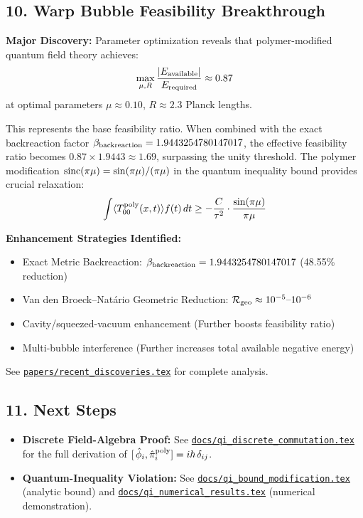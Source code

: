 \documentclass[12pt]{article}
\begin{document}
\subsection*{10. Warp Bubble Feasibility Breakthrough}
\textbf{Major Discovery:} Parameter optimization reveals that polymer-modified quantum field theory achieves:
\begin{align*}
  \max_{\mu,R}\frac{|E_{\rm available}|}{E_{\rm required}} \approx 0.87
\end{align*}
at optimal parameters $\mu \approx 0.10$, $R \approx 2.3$ Planck lengths.

This represents the base feasibility ratio. When combined with the exact backreaction factor $\beta_{\rm backreaction} = 1.9443254780147017$, the effective feasibility ratio becomes $0.87 \times 1.9443 \approx 1.69$, surpassing the unity threshold. The polymer modification $\operatorname{sinc}(\pi\mu) = \sin(\pi\mu)/(\pi\mu)$ in the quantum inequality bound provides crucial relaxation:
\begin{align*}
  \int \langle T_{00}^{\rm poly}(x,t) \rangle f(t)\,dt \geq -\frac{C}{\tau^2} \cdot \frac{\sin(\pi\mu)}{\pi\mu}
\end{align*}

\textbf{Enhancement Strategies Identified:}
\begin{itemize}
  \item Exact Metric Backreaction: $\beta_{\rm backreaction} = 1.9443254780147017$ (48.55\% reduction)
  \item Van den Broeck–Natário Geometric Reduction: $\mathcal{R}_{\rm geo}\approx10^{-5}\text{–}10^{-6}$
  \item Cavity/squeezed-vacuum enhancement (Further boosts feasibility ratio)
  \item Multi-bubble interference (Further increases total available negative energy)
\end{itemize}

See \href{https://github.com/arcticoder/warp-bubble-qft/blob/main/papers/recent_discoveries.tex}{\texttt{papers/recent\_discoveries.tex}} for complete analysis.

\subsection*{11. Next Steps}
\begin{itemize}
  \item 
    \textbf{Discrete Field-Algebra Proof:} 
    See \href{https://github.com/arcticoder/warp-bubble-qft/blob/main/docs/qi_discrete_commutation.tex}{\texttt{docs/qi\_discrete\_commutation.tex}} 
    for the full derivation of \([\,\hat\phi_i,\hat\pi_i^{\rm poly}]=i\hbar\,\delta_{ij}\).
  \item 
    \textbf{Quantum-Inequality Violation:} 
    See 
    \href{https://github.com/arcticoder/warp-bubble-qft/blob/main/docs/qi_bound_modification.tex}{\texttt{docs/qi\_bound\_modification.tex}} 
    (analytic bound) and 
    \href{https://github.com/arcticoder/warp-bubble-qft/blob/main/docs/qi_numerical_results.tex}{\texttt{docs/qi\_numerical\_results.tex}} 
    (numerical demonstration). 
\end{itemize}
\end{document}
